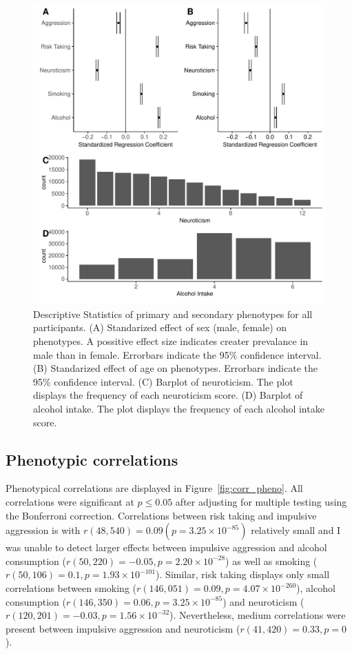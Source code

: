 \begin{figure}[htpb]
  \centering
  \includegraphics[width=0.8\linewidth]{ukb_assoc/figure/phenotype/descriptives_plots.pdf}
  \caption{
    Descriptive Statistics of primary and secondary phenotypes for all participants.
    (A) Standarized effect of sex (male, female) on phenotypes. 
    A possitive effect size indicates creater prevalance in male than in female.
    Errorbars indicate the 95\% confidence interval.
    (B) Standarized effect of age on phenotypes.
    Errorbars indicate the 95\% confidence interval.
    (C) Barplot of neuroticism.
    The plot displays the frequency of each neuroticism score.
    (D) Barplot of alcohol intake.
    The plot displays the frequency of each alcohol intake score.
  }\label{fig:disc}
\end{figure}

\subsection{Phenotypic correlations}
\label{sub:phenotype_correlations}

Phenotypical correlations are displayed in Figure~\ref{fig:corr_pheno}. 
All correlations were significant at $p\leq 0.05$ after adjusting for multiple testing using the Bonferroni correction.
Correlations between risk taking and impulsive aggression is with $r(48,540)=0.09 (p=3.25\times 10^{-85})$ relatively small
and I was unable to detect larger effects between impulsive aggression and alcohol consumption ($r(50,220)=-0.05, p=2.20\times 10^{-28}$)
as well as smoking ($r(50,106)=0.1, p=1.93\times 10^{-101}$).
Similar, risk taking displays only small correlations between
smoking ($r(146,051)=0.09, p=4.07\times 10^{-260}$),
alcohol consumption ($r(146,350)=0.06, p=3.25\times 10^{-85}$)
and neuroticism ($r(120,201)=-0.03, p=1.56\times 10^{-32}$). 
Nevertheless, medium correlations were present between impulsive aggression and neuroticism ($r(41,420)=0.33, p=0$).

